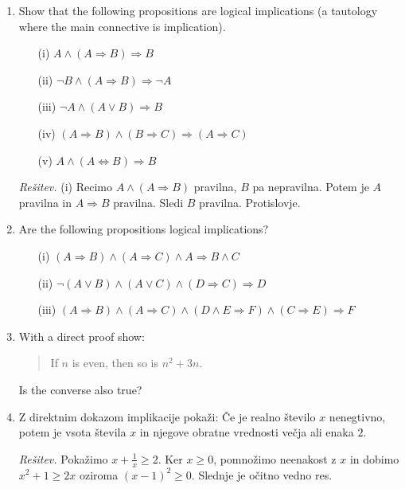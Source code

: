 \documentclass[11pt,paper=b5,footinclude,headinclude]{scrbook} %
\theoremstyle{remark}
\theoremstyle{definition} %
\theoremstyle{theorem} %
\begin{document}
\begin{enumerate}
\item Show that the following propositions are logical implications (a tautology where the main connective is implication).
\begin{enumerate}
\item[(i)] $A \wedge (A \Rightarrow B) \Rightarrow B$
\item[(ii)] $\neg B \wedge (A \Rightarrow B) \Rightarrow \neg A$
\item[(iii)] $\neg A \wedge (A \vee B) \Rightarrow B$
\item[(iv)] $(A \Rightarrow B) \wedge (B \Rightarrow C) \Rightarrow (A \Rightarrow C)$
\item[(v)] $A \wedge (A \Leftrightarrow B) \Rightarrow B$
\end{enumerate}

\emph{Rešitev.} (i) Recimo $A \wedge (A \Rightarrow B)$ pravilna, $B$ pa nepravilna. Potem je $A$ pravilna in $A\Rightarrow B$ pravilna. Sledi $B$ pravilna. Protislovje. 


\item Are the following propositions logical implications?
\begin{enumerate}
\item[(i)] $(A \Rightarrow B ) \wedge (A \Rightarrow C) \wedge A \Rightarrow B \wedge C$
\item[(ii)] $\neg (A \vee B) \wedge (A\vee C) \wedge (D\Rightarrow C) \Rightarrow D$
\item[(iii)] $(A\Rightarrow B) \wedge (A\Rightarrow C) \wedge (D\wedge E \Rightarrow F) \wedge (C\Rightarrow E) \Rightarrow F$
\end{enumerate}

\item With a direct proof show:
\begin{quote}
    If $n$ is even, then so is $n^2 +3n$.
\end{quote}
Is the converse also true?


\item Z direktnim dokazom implikacije pokaži: Če je realno število $x$ nenegtivno, potem je vsota  števila $x$  in njegove obratne vrednosti  večja ali enaka $2$.


\emph{ Rešitev.} Pokažimo $x + \frac{1}{x}\geq 2$. Ker $x\geq 0$, pomnožimo neenakost z $x$ in dobimo
$x^2 + 1 \geq 2x$ oziroma $(x- 1)^2\geq 0$. Slednje je očitno vedno res.


\end{enumerate}
\end{document}

